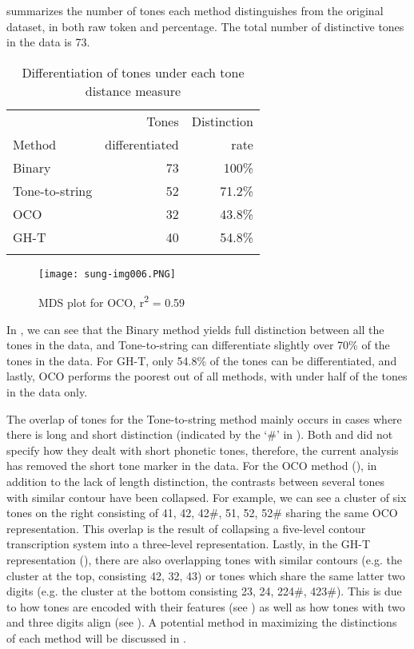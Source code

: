\documentclass[output=paper, chinesefont]{langscibook}
\begin{document}
 summarizes the number of tones each method distinguishes from the original dataset, in both raw token and percentage. The total number of distinctive tones in the data is 73.


\begin{table}
\begin{tabular}{lrr}
\lsptoprule
         & Tones & Distinction \\
{Method} & {differentiated} & {rate}\\\midrule
Binary & 73 & 100\%\\
Tone-to-string & 52 & 71.2\%\\
OCO & 32 & 43.8\%\\
GH-T & 40 & 54.8\%\\
\lspbottomrule
\end{tabular}
\caption{Differentiation of tones under each tone distance measure}
\label{tab:sung:7}
\end{table}

   
\begin{figure}
\texttt{[image: sung-img006.PNG]}
\caption{MDS plot for OCO, r\textsuperscript{2} = 0.59}
\label{fig:sung:6}
\end{figure}

In , we can see that the Binary method yields full distinction between all the tones in the data, and Tone-to-string can differentiate slightly over 70\% of the tones in the data. For GH-T, only 54.8\% of the tones can be differentiated, and lastly, OCO performs the poorest out of all methods, with under half of the tones in the data only.

The overlap of tones for the Tone-to-string method mainly occurs in cases where there is long and short distinction (indicated by the ‘\#’ in ). Both \citet{YangCastro2008} and \citet{Tang2009} did not specify how they dealt with short phonetic tones, therefore, the current analysis has removed the short tone marker in the data. For the OCO method (), in addition to the lack of length distinction, the contrasts between several tones with similar contour have been collapsed. For example, we can see a cluster of six tones on the right consisting of 41, 42, 42\#, 51, 52, 52\# sharing the same OCO representation. This overlap is the result of collapsing a five-level contour transcription system into a three-level representation. Lastly, in the GH-T representation (), there are also overlapping tones with similar contours (e.g. the cluster at the top, consisting 42, 32, 43) or tones which share the same latter two digits (e.g. the cluster at the bottom consisting 23, 24, 224\#, 423\#). This is due to how tones are encoded with their features (see ) as well as how tones with two and three digits align (see ). A potential method in maximizing the distinctions of each method will be discussed in .
\end{document}
